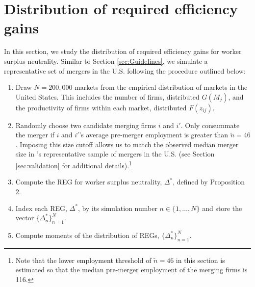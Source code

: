 \documentclass[12pt]{article}
\theoremstyle{prop}
\begin{document}
\clearpage

\setcounter{table}{0} \setcounter{figure}{0} \renewcommand{\theequation}{C\arabic{equation}}
\renewcommand{\thetable}{C\arabic{table}} %
\renewcommand{\thefigure}{C\arabic{figure}}
\renewcommand{\thesubsection}{\thesection.\arabic{subsection}}


\section{Distribution of required efficiency gains}

 
In this section, we study the distribution of required efficiency gains for worker surplus neutrality. Similar to Section \ref{sec:Guidelines}, we simulate a representative set of mergers in the U.S. following the procedure outlined below: \vspace*{-.2cm}
{\small
\begin{enumerate}
	\item Draw $N=200,000$ markets from the empirical distribution of markets in the United States. This includes the number of firms, distributed $G(M_j)$, and the productivity of firms within each market, distributed $F(z_{ij})$.\vspace*{-.2cm}
	\item Randomly choose two candidate merging firms $i$ and $i'$. Only consummate the merger if $i$ and $i'$'s average pre-merger employment is greater than $\tilde{n}=46$. Imposing this size cutoff allows us to match the observed median merger size in \citet{Arnold}'s representative sample of mergers in the U.S. (see Section \ref{sec:validation} for additional details).\footnote{Note that the lower employment threshold of $\tilde{n}=46$ in this section is estimated so that the median pre-merger employment of the merging firms is 116. }
 \vspace*{-.2cm}
	\item Compute the REG for worker surplus neutrality, $\Delta^*$,  defined by Proposition 2.\vspace*{-.2cm}
	\item Index each REG, $\Delta^*$, by its simulation number $n\in\{1,\ldots,N\}$  and store the vector  $\{\Delta^*_n\}_{n=1}^N$.\vspace*{-.2cm}
	\item Compute moments of the distribution of  REGs, $\{\Delta^*_n\}_{n=1}^N$.\vspace*{-.2cm}
\end{enumerate}}
\end{document}
